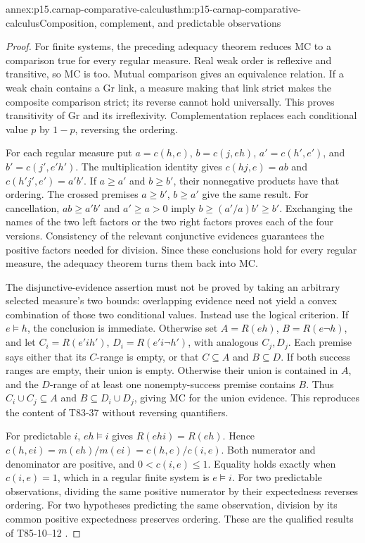 \begin{annexitem}{annex:p15.carnap-comparative-calculus}{thm:p15-carnap-comparative-calculus}{Composition, complement, and predictable observations}
\begin{proof}
For finite systems, the preceding adequacy theorem reduces MC to a
comparison true for every regular measure. Real weak order is reflexive
and transitive, so MC is too. Mutual comparison gives an equivalence
relation. If a weak chain contains a Gr link, a measure making that
link strict makes the composite comparison strict; its reverse cannot
hold universally. This proves transitivity of Gr and its irreflexivity.
Complementation replaces each conditional value \(p\) by \(1-p\),
reversing the ordering.

For each regular measure put
\(a=c(h,e)\), \(b=c(j,eh)\),
\(a'=c(h',e')\), and \(b'=c(j',e'h')\).
The multiplication identity gives \(c(hj,e)=ab\) and
\(c(h'j',e')=a'b'\). If \(a\geq a'\) and \(b\geq b'\),
their nonnegative products have that ordering. The crossed premises
\(a\geq b'\), \(b\geq a'\) give the same result. For
cancellation, \(ab\geq a'b'\) and \(a'\geq a>0\) imply
\(b\geq(a'/a)b'\geq b'\). Exchanging the names of the two
left factors or the two right factors proves each of the four versions.
Consistency of the relevant conjunctive evidences guarantees the
positive factors needed for division. Since these conclusions hold for
every regular measure, the adequacy theorem turns them back into MC.

The disjunctive-evidence assertion must not be proved by taking an
arbitrary selected measure's two bounds: overlapping evidence need
not yield a convex combination of those two conditional values.
Instead use the logical criterion. If \(e\models h\), the
conclusion is immediate. Otherwise set \(A=R(eh)\),
\(B=R(e\neg h)\), and let
\(C_i=R(e'ih')\), \(D_i=R(e'i\neg h')\), with analogous
\(C_j,D_j\). Each premise says either that its \(C\)-range is
empty, or that \(C\subseteq A\) and \(B\subseteq D\).
If both success ranges are empty, their union is empty. Otherwise
their union is contained in \(A\), and the \(D\)-range of
at least one nonempty-success premise contains \(B\). Thus
\(C_i\cup C_j\subseteq A\) and
\(B\subseteq D_i\cup D_j\), giving MC for the union evidence.
This reproduces the content of T83-37 without reversing quantifiers.

For predictable \(i\), \(eh\models i\) gives
\(R(ehi)=R(eh)\). Hence
\(c(h,ei)=m(eh)/m(ei)=c(h,e)/c(i,e)\).
Both numerator and denominator are positive, and
\(0<c(i,e)\leq1\). Equality holds exactly when
\(c(i,e)=1\), which in a regular finite system is
\(e\models i\). For two predictable observations, dividing
the same positive numerator by their expectedness reverses ordering.
For two hypotheses predicting the same observation, division by its
common positive expectedness preserves ordering. These are the
qualified results of T85-10--12 \cite{Carnap1950Probability}.
\end{proof}
\end{annexitem}

